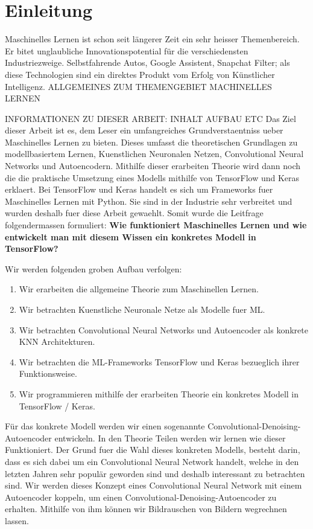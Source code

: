 \chapter*{Einleitung}
Maschinelles Lernen ist schon seit längerer Zeit ein sehr heisser Themenbereich.
Er bitet unglaubliche Innovationspotential für die verschiedensten
Industriezweige. Selbstfahrende Autos, Google Assistent, Snapchat Filter; als
diese Technologien sind ein direktes Produkt vom Erfolg von Künstlicher
Intelligenz.
ALLGEMEINES ZUM THEMENGEBIET MACHINELLES LERNEN

INFORMATIONEN ZU DIESER ARBEIT: INHALT AUFBAU ETC
Das Ziel dieser Arbeit ist es, dem Leser ein umfangreiches Grundverstaentniss
ueber Maschinelles Lernen zu bieten. Dieses umfasst die theoretischen Grundlagen
zu modellbasiertem Lernen, Kuenstlichen Neuronalen Netzen, Convolutional Neural
Networks und Autoencodern. Mithilfe dieser erarbeiten Theorie wird dann noch die
die praktische Umsetzung eines Modells mithilfe von TensorFlow und Keras
erklaert. Bei TensorFlow und Keras handelt es sich um Frameworks fuer
Maschinelles Lernen mit Python. Sie sind in der Industrie sehr verbreitet und
wurden deshalb fuer diese Arbeit gewaehlt.
\para{}
Somit wurde die Leitfrage folgendermassen formuliert:
\textbf{Wie funktioniert Maschinelles Lernen und wie entwickelt man mit diesem
  Wissen ein konkretes Modell in TensorFlow?}
\para{}

Wir werden folgenden groben Aufbau verfolgen:

\begin{enumerate}
  \item{Wir erarbeiten die allgemeine Theorie zum Maschinellen Lernen.}
  \item{Wir betrachten Kuenstliche Neuronale Netze als Modelle fuer ML.}
  \item{Wir betrachten Convolutional Neural Networks und Autoencoder als
      konkrete KNN Architekturen.}
  \item{Wir betrachten die ML-Frameworks TensorFlow und Keras bezueglich ihrer Funktionsweise.}
  \item{Wir programmieren mithilfe der erarbeiten Theorie ein konkretes Modell
      in TensorFlow / Keras.}
\end{enumerate}

Für das konkrete Modell werden wir einen sogenannte
Convolutional-Denoising-Autoencoder entwickeln. In den Theorie Teilen werden wir
lernen wie dieser Funktioniert. Der Grund fuer die Wahl dieses konkreten Modells,
besteht darin, dass es sich dabei um ein Convolutional Neural Network handelt,
welche in den letzten Jahren sehr populär geworden sind und deshalb interessant
zu betrachten sind. Wir werden dieses Konzept eines Convolutional Neural Network
mit einem Autoencoder koppeln, um einen Convolutional-Denoising-Autoencoder zu
erhalten. Mithilfe von ihm können wir Bildrauschen von Bildern wegrechnen lassen.


